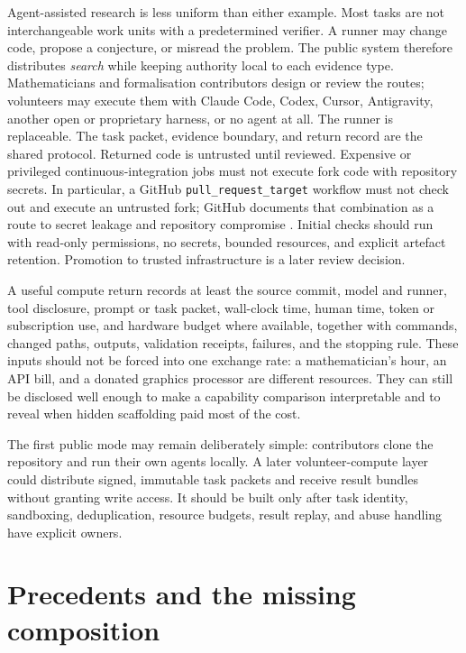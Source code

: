 \documentclass[10pt]{article}
\begin{document}
Agent-assisted research is less uniform than either example.  Most tasks are
not interchangeable work units with a predetermined verifier.  A runner may
change code, propose a conjecture, or misread the problem.  The public system
therefore distributes \emph{search} while keeping authority local to each
evidence type.  Mathematicians and formalisation contributors design or review
the routes; volunteers may execute them with Claude Code, Codex, Cursor,
Antigravity, another open or proprietary harness, or no agent at all.  The
runner is replaceable.  The task packet, evidence boundary, and return record
are the shared protocol.  Returned code is untrusted until reviewed.  Expensive or
privileged continuous-integration jobs must not execute fork code with
repository secrets.  In particular, a GitHub \texttt{pull\_request\_target}
workflow must not check out and execute an untrusted fork; GitHub documents
that combination as a route to secret leakage and repository compromise
\cite{githubsecurity}.  Initial checks should run with read-only permissions,
no secrets, bounded resources, and explicit artefact retention.  Promotion to
trusted infrastructure is a later review decision.

A useful compute return records at least the source commit, model and runner,
tool disclosure, prompt or task packet, wall-clock time, human time, token or
subscription use, and hardware budget where available, together with commands,
changed paths, outputs, validation receipts, failures, and the stopping rule.
These inputs should not be forced into one exchange rate: a mathematician's
hour, an API bill, and a donated graphics processor are different resources.
They can still be disclosed well enough to make a capability comparison
interpretable and to reveal when hidden scaffolding paid most of the cost.

The first public mode may remain deliberately simple: contributors clone the
repository and run their own agents locally.  A later volunteer-compute layer
could distribute signed, immutable task packets and receive result bundles
without granting write access.  It should be built only after task identity,
sandboxing, deduplication, resource budgets, result replay, and abuse handling
have explicit owners.

\section{Precedents and the missing composition}\label{sec:prior}
\end{document}

